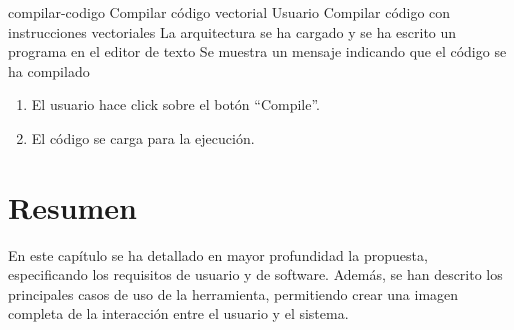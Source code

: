 \begin{useCase}{compilar-codigo}
  {Compilar código vectorial}
  {Usuario}
  {Compilar código con instrucciones vectoriales}
  {La arquitectura se ha cargado y se ha escrito un programa en el editor de texto}
  {Se muestra un mensaje indicando que el código se ha compilado}
  \begin{enumerate}
    \item El usuario hace click sobre el botón ``Compile''.
    \item El código se carga para la ejecución.
  \end{enumerate}
\end{useCase}
\FloatBarrier

\section{Resumen}

En este capítulo se ha detallado en mayor profundidad la propuesta, especificando los requisitos de usuario y de software. Además, se han descrito los principales casos de uso de la herramienta, permitiendo crear una imagen completa de la interacción entre el usuario y el sistema.
